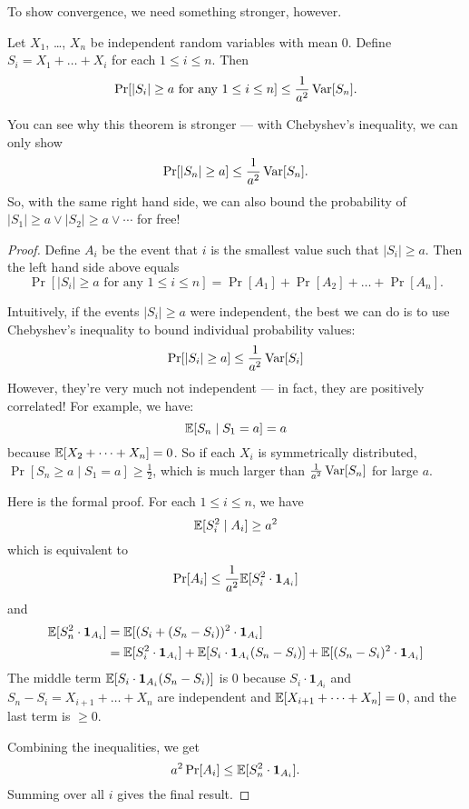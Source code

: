To show convergence, we need something stronger, however.
\begin{theorem}
	Let $X_1$, \dots, $X_n$ be independent random variables with mean $0$.
	Define $S_i = X_1+\dots+X_i$ for each $1 \leq i \leq n$.
	Then
	\[ \Pr[|S_i| \geq a \text{ for any }1 \leq i \leq n]
		\leq \frac{1}{a^2} \operatorname{Var}[S_n]. \]
\end{theorem}
You can see why this theorem is stronger --- with Chebyshev's inequality, we can only show
\[ \Pr[|S_n| \geq a] \leq \frac{1}{a^2} \operatorname{Var}[S_n]. \]
So, with the same right hand side, we can also bound the probability of
$|S_1|\geq a \vee |S_2| \geq a \vee \cdots$ for free!
\begin{proof}
	Define $A_i$ be the event that $i$ is the smallest value such that $|S_i|\geq a$. Then the left
	hand side above equals
	\[ \Pr[|S_i| \geq a \text{ for any }1 \leq i \leq n] = \Pr[A_1]+\Pr[A_2]+\dots+\Pr[A_n]. \]

	Intuitively, if the events $|S_i|\geq a$ were independent,
	the best we can do is to use Chebyshev's inequality to bound individual probability values:
	\[ \Pr[|S_i|\geq a] \leq \frac{1}{a^2} \operatorname{Var}[S_i] \]
	However, they're very much not independent --- in fact, they are positively correlated!
	For example, we have:
	\[ \mathbb E[S_n \mid S_1 = a] = a \]
	because $\mathbb E[X_2+\dots+X_n] = 0$.
	So if each $X_i$ is symmetrically distributed, $\Pr[S_n \geq a \mid S_1 = a] \geq \frac{1}{2}$,
	which is much larger than $\frac{1}{a^2} \operatorname{Var}[S_n]$ for large $a$.

	Here is the formal proof.
	For each $1 \leq i \leq n$, we have
	\[ \mathbb E[S_i^2 \mid A_i] \geq a^2 \]
	which is equivalent to
	\[ \Pr[A_i] \leq \frac{1}{a^2} \mathbb E[S_i^2 \cdot \mathbf{1}_{A_i}] \]
	and
	\begin{align*}
		\mathbb E[S_n^2 \cdot \mathbf{1}_{A_i}]
		&= \mathbb E[(S_i + (S_n-S_i))^2 \cdot \mathbf{1}_{A_i}] \\
		&= \mathbb E[S_i^2 \cdot \mathbf{1}_{A_i}]
		+ \mathbb E[S_i  \cdot \mathbf{1}_{A_i} (S_n-S_i)]
		+ \mathbb E[(S_n-S_i)^2 \cdot \mathbf{1}_{A_i}] \\
	\end{align*}
	The middle term $\mathbb E[S_i  \cdot \mathbf{1}_{A_i} (S_n-S_i)]$ is $0$
	because $S_i  \cdot \mathbf{1}_{A_i}$ and $S_n-S_i = X_{i+1}+\dots+X_n$ are independent
	and $\mathbb E[X_{i+1}+\dots+X_n]=0$,
	and the last term is $\geq 0$.

	Combining the inequalities, we get
	\[ a^2 \Pr[A_i] \leq \mathbb E[S_n^2 \cdot \mathbf{1}_{A_i}]. \]
	Summing over all $i$ gives the final result.
\end{proof}

